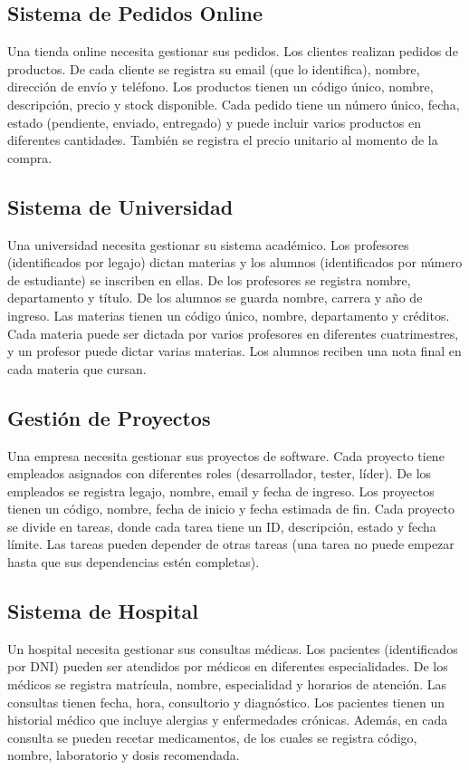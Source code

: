 \documentclass[12pt]{article}
\begin{document}
\subsection{Sistema de Pedidos Online}
Una tienda online necesita gestionar sus pedidos. Los clientes realizan pedidos de productos. De cada cliente se registra su email (que lo identifica), nombre, dirección de envío y teléfono. Los productos tienen un código único, nombre, descripción, precio y stock disponible. Cada pedido tiene un número único, fecha, estado (pendiente, enviado, entregado) y puede incluir varios productos en diferentes cantidades. También se registra el precio unitario al momento de la compra.

\subsection{Sistema de Universidad}
Una universidad necesita gestionar su sistema académico. Los profesores (identificados por legajo) dictan materias y los alumnos (identificados por número de estudiante) se inscriben en ellas. De los profesores se registra nombre, departamento y título. De los alumnos se guarda nombre, carrera y año de ingreso. Las materias tienen un código único, nombre, departamento y créditos. Cada materia puede ser dictada por varios profesores en diferentes cuatrimestres, y un profesor puede dictar varias materias. Los alumnos reciben una nota final en cada materia que cursan.

\subsection{Gestión de Proyectos}
Una empresa necesita gestionar sus proyectos de software. Cada proyecto tiene empleados asignados con diferentes roles (desarrollador, tester, líder). De los empleados se registra legajo, nombre, email y fecha de ingreso. Los proyectos tienen un código, nombre, fecha de inicio y fecha estimada de fin. Cada proyecto se divide en tareas, donde cada tarea tiene un ID, descripción, estado y fecha límite. Las tareas pueden depender de otras tareas (una tarea no puede empezar hasta que sus dependencias estén completas).

\subsection{Sistema de Hospital}
Un hospital necesita gestionar sus consultas médicas. Los pacientes (identificados por DNI) pueden ser atendidos por médicos en diferentes especialidades. De los médicos se registra matrícula, nombre, especialidad y horarios de atención. Las consultas tienen fecha, hora, consultorio y diagnóstico. Los pacientes tienen un historial médico que incluye alergias y enfermedades crónicas. Además, en cada consulta se pueden recetar medicamentos, de los cuales se registra código, nombre, laboratorio y dosis recomendada.
\end{document}

